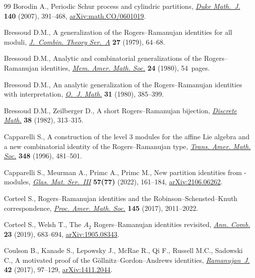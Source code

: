 \documentclass[pdftex]{sigma}
\numberwithin{equation}{section}
\theoremstyle{definition}
\begin{document}
\begin{thebibliography}{99}
Borodin A., Periodic {S}chur process and cylindric partitions,
 \href{https://doi.org/10.1215/S0012-7094-07-14031-6}{\textit{Duke Math.~J.}}
 \textbf{140} (2007), 391--468,
 \href{http://arxiv.org/abs/math.CO/0601019}{arXiv:math.CO/0601019}.

Bressoud D.M., A generalization of the {R}ogers--{R}amanujan identities for all
 moduli,
 \href{https://doi.org/10.1016/0097-3165(79)90008-6}{\textit{J.~Combin. Theory
 Ser.~A}} \textbf{27} (1979), 64--68.

Bressoud D.M., Analytic and combinatorial generalizations of the
 {R}ogers--{R}amanujan identities,
 \href{https://doi.org/10.1090/memo/0227}{\textit{Mem. Amer. Math. Soc.}}
 \textbf{24} (1980), 54~pages.

Bressoud D.M., An analytic generalization of the {R}ogers--{R}amanujan
 identities with interpretation,
 \href{https://doi.org/10.1093/qmath/31.4.385}{\textit{Q.~J. Math.}}
 \textbf{31} (1980), 385--399.

Bressoud D.M., Zeilberger D., A short {R}ogers--{R}amanujan bijection,
 \href{https://doi.org/10.1016/0012-365X(82)90298-9}{\textit{Discrete Math.}}
 \textbf{38} (1982), 313--315.

Capparelli S., A construction of the level {$3$} modules for the affine {L}ie
 algebra  and a new combinatorial identity of the
 {R}ogers--{R}amanujan type,
 \href{https://doi.org/10.1090/S0002-9947-96-01535-8}{\textit{Trans. Amer.
 Math. Soc.}} \textbf{348} (1996), 481--501.

Capparelli S., Meurman A., Primc A., Primc M., New partition identities from
 -modules,
 \href{https://doi.org/10.3336/gm.57.2.01}{\textit{Glas. Mat. Ser.~III}}
 \textbf{57(77)} (2022), 161--184,
 \href{http://arxiv.org/abs/2106.06262}{arXiv:2106.06262}.

Corteel S., Rogers--{R}amanujan identities and the
 {R}obinson--{S}chensted--{K}nuth correspondence,
 \href{https://doi.org/10.1090/proc/13373}{\textit{Proc. Amer. Math. Soc.}}
 \textbf{145} (2017), 2011--2022.

Corteel S., Welsh T., The {$A_2$} {R}ogers--{R}amanujan identities revisited,
 \href{https://doi.org/10.1007/s00026-019-00446-7}{\textit{Ann. Comb.}}
 \textbf{23} (2019), 683--694,
 \href{http://arxiv.org/abs/1905.08343}{arXiv:1905.08343}.

Coulson B., Kanade S., Lepowsky J., McRae R., Qi F., Russell M.C., Sadowski C.,
 A motivated proof of the {G}\"{o}llnitz--{G}ordon--{A}ndrews identities,
 \href{https://doi.org/10.1007/s11139-015-9722-8}{\textit{Ramanujan~J.}}
 \textbf{42} (2017), 97--129,
 \href{http://arxiv.org/abs/1411.2044}{arXiv:1411.2044}.


\end{thebibliography}
\end{document}
